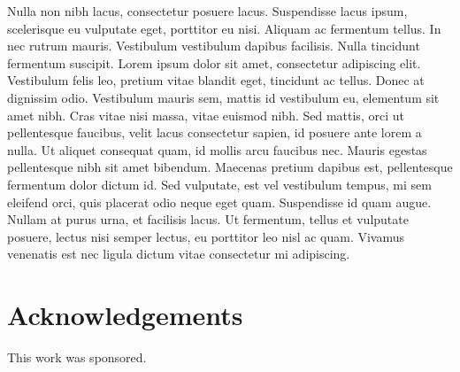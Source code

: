 \begin{refsection}
Nulla non nibh lacus, consectetur posuere lacus. Suspendisse lacus
ipsum, scelerisque eu vulputate eget, porttitor eu nisi. Aliquam ac
fermentum tellus. In nec rutrum mauris. Vestibulum vestibulum dapibus
facilisis. Nulla tincidunt fermentum suscipit. Lorem ipsum dolor sit
amet, consectetur adipiscing elit. Vestibulum felis leo, pretium vitae
blandit eget, tincidunt ac tellus. Donec at dignissim odio. Vestibulum
mauris sem, mattis id vestibulum eu, elementum sit amet nibh. Cras
vitae nisi massa, vitae euismod nibh. Sed mattis, orci ut pellentesque
faucibus, velit lacus consectetur sapien, id posuere ante lorem a
nulla. Ut aliquet consequat quam, id mollis arcu faucibus nec. Mauris
egestas pellentesque nibh sit amet bibendum. Maecenas pretium dapibus
est, pellentesque fermentum dolor dictum id. Sed vulputate, est vel
vestibulum tempus, mi sem eleifend orci, quis placerat odio neque eget
quam. Suspendisse id quam augue. Nullam at purus urna, et facilisis
lacus. Ut fermentum, tellus et vulputate posuere, lectus nisi semper
lectus, eu porttitor leo nisl ac quam. Vivamus venenatis est nec
ligula dictum vitae consectetur mi adipiscing.


\section{Acknowledgements}
\label{sec:acknowledgements}

This work was sponsored.
\printbibliography[heading=subbibliography]
\end{refsection}
